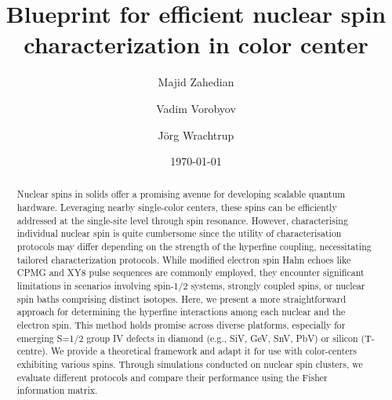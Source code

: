\documentclass[%
 reprint,
superscriptaddress,
 amsmath,amssymb,
 aps,
]{revtex4-2}
\begin{document}

\title{Blueprint for efficient nuclear spin characterization in  color center}%

\author{Majid Zahedian}


\author{Vadim Vorobyov}

 
\author{J\"org Wrachtrup}

\date{\today}%

\begin{abstract}
Nuclear spins in solids offer a promising avenue for developing scalable quantum hardware. Leveraging nearby single-color centers, these spins can be efficiently addressed at the single-site level through spin resonance.
However, characterising individual nuclear spin is quite cumbersome since the utility of characterisation protocols may differ depending on the strength of the hyperfine coupling, necessitating tailored characterization protocols.
While modified electron spin Hahn echoes like CPMG and XY8 pulse sequences are commonly employed, they encounter significant limitations in scenarios involving spin-1/2 systems, strongly coupled spins, or nuclear spin baths comprising distinct isotopes.
Here, we present a more straightforward approach for determining the hyperfine interactions among each nuclear and the electron spin. 
This method holds promise across diverse platforms, especially for emerging S=1/2 group IV defects in diamond (e.g., SiV, GeV, SnV, PbV) or silicon (T-centre). 
We provide a theoretical framework and adapt it for use with color-centers exhibiting various spins. Through simulations conducted on nuclear spin clusters, we evaluate different protocols and compare their performance using the Fisher information matrix.
\end{abstract}
\end{document}
